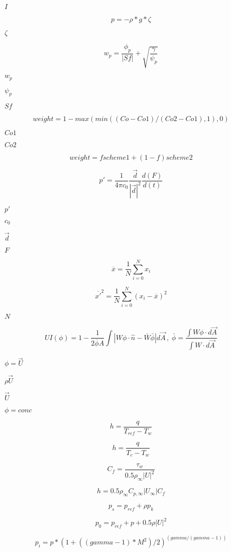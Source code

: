 \documentclass{article}
\begin{document}
$ I $
\pagebreak

\[ p = -\rho*g*\zeta \]
\pagebreak

$ \zeta $
\pagebreak

\[ w_p = \frac{\phi_p}{|Sf|} + \sqrt{\frac{\gamma}{\psi_p}} \]
\pagebreak

$ w_p $
\pagebreak

$ \psi_p $
\pagebreak

$ Sf $
\pagebreak

\[ weight = 1 - max(min((Co - Co1)/(Co2 - Co1), 1), 0) \]
\pagebreak

$ Co1 $
\pagebreak

$ Co2 $
\pagebreak

\[ weight = f scheme1 + (1 - f) scheme2 \]
\pagebreak

\[ p' = \frac{1}{4 \pi c_0}\frac{\vec d}{|\vec d|^2}\frac{d(F)}{d(t)} \]
\pagebreak

$ p' $
\pagebreak

$ c_0 $
\pagebreak

$ \vec d $
\pagebreak

$ F $
\pagebreak

\[ \overline{x} = \frac{1}{N}\displaystyle\sum\limits_{i=0}^N x_i \]
\pagebreak

\[ \overline{x'}^2 = \frac{1}{N}\displaystyle\sum\limits_{i=0}^N (x_i - \overline{x})^2 \]
\pagebreak

$N$
\pagebreak

\[ UI(\phi) = 1 - \frac{1}{2 \overline{\phi} A} \int{\left| W \phi \cdot \hat{n} - \bar{W} \bar{\phi}\right| d\vec{A}} \,,\; \bar{\phi} = \frac{\int{W \phi \cdot d\vec{A}}}{\int{W \cdot d\vec{A}}} \]
\pagebreak

$ \phi = \vec{U} $
\pagebreak

$ \rho \vec{U} $
\pagebreak

$ \vec{U} $
\pagebreak

$ \phi = conc $
\pagebreak

\[ h = \frac{q}{T_{ref} - T_w} \]
\pagebreak

\[ h = \frac{q}{T_c - T_w} \]
\pagebreak

\[ C_f = \frac{\tau_w}{0.5 \rho_\infty |U|^2} \]
\pagebreak

\[ h = 0.5 \rho_\infty C_{p,\infty} |U_{\infty}| C_f \]
\pagebreak

\[ p_s = p_{ref} + \rho p_k \]
\pagebreak

\[ p_0 = p_{ref} + p + 0.5 \rho |U|^2 \]
\pagebreak

\[ p_i = p*(1 + ((gamma-1)*M^2)/2)^(gamma/(gamma - 1)) \]
\pagebreak
\end{document}
